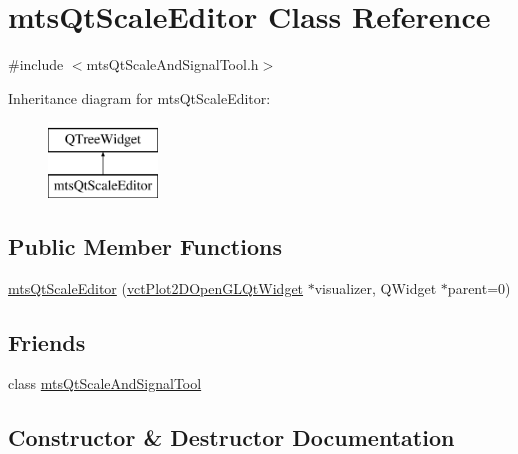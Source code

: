 \hypertarget{classmts_qt_scale_editor}{}\section{mts\+Qt\+Scale\+Editor Class Reference}
\label{classmts_qt_scale_editor}


{\ttfamily \#include $<$mts\+Qt\+Scale\+And\+Signal\+Tool.\+h$>$}

Inheritance diagram for mts\+Qt\+Scale\+Editor\+:\begin{figure}[H]
\begin{center}
\leavevmode
\includegraphics[height=2.000000cm]{dd/dd9/classmts_qt_scale_editor}
\end{center}
\end{figure}
\subsection*{Public Member Functions}
\begin{DoxyCompactItemize}
\item 
\hyperlink{classmts_qt_scale_editor_af5a4e139d02a7291f0d837df58d57d45}{mts\+Qt\+Scale\+Editor} (\hyperlink{classvct_plot2_d_open_g_l_qt_widget}{vct\+Plot2\+D\+Open\+G\+L\+Qt\+Widget} $\ast$visualizer, Q\+Widget $\ast$parent=0)
\end{DoxyCompactItemize}
\subsection*{Friends}
\begin{DoxyCompactItemize}
\item 
class \hyperlink{classmts_qt_scale_editor_a9600f951fd4e3eb991ffb337d453aec5}{mts\+Qt\+Scale\+And\+Signal\+Tool}
\end{DoxyCompactItemize}


\subsection{Constructor \& Destructor Documentation}
\hypertarget{classmts_qt_scale_editor_af5a4e139d02a7291f0d837df58d57d45}{}
